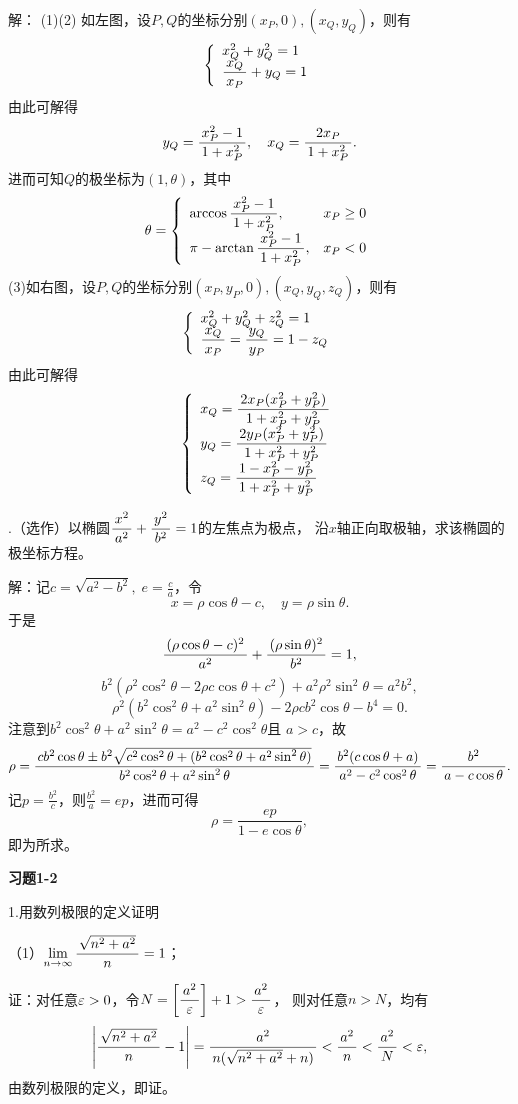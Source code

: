解：
(1)(2) 如左图，设$P,Q$的坐标分别$(x_P,0),(x_Q,y_Q)$，则有
$$
\left\{
\begin{array}{l}
	x^2_Q+y^2_Q=1\\
	\displaystyle\frac{\,{x_Q}\,}{\,{x_P}\,}+y_Q=1
\end{array}
\right.
$$
由此可解得
$$y_Q=\displaystyle\frac{\,{x^2_P-1}\,}{\,{1+x^2_P}\,},\quad x_Q=\displaystyle\frac{\,{2x_P}\,}{\,{1+x^2_P}\,}.$$
进而可知$Q$的极坐标为$(1,\theta)$，其中
$$\theta=
\left\{
\begin{array}{ll}
	\arccos\displaystyle\frac{\,{x^2_P-1}\,}{\,{1+x^2_P}\,},& x_P\geq 0\\
	\pi-\arctan\displaystyle\frac{\,{x^2_P-1}\,}{\,{1+x^2_P}\,}, & x_P<0
\end{array}
\right.
$$
(3)如右图，设$P,Q$的坐标分别$(x_P,y_P,0),(x_Q,y_Q,z_Q)$，则有
$$
\left\{
\begin{array}{l}
	x^2_Q+y^2_Q+z^2_Q=1\\
	\displaystyle\frac{\,{x_Q}\,}{\,{x_P}\,}=\displaystyle\frac{\,{y_Q}\,}{\,{y_P}\,}=1-z_Q
\end{array}
\right.
$$
由此可解得
$$
\left\{
\begin{array}{l}
	x_Q=\displaystyle\frac{\,{2x_P(x^2_P+y^2_P)}\,}{\,{1+x^2_P+y^2_P}\,}\\
	y_Q=\displaystyle\frac{\,{2y_P(x^2_P+y^2_P)}\,}{\,{1+x^2_P+y^2_P}\,}\\
	z_Q=\displaystyle\frac{\,{1-x^2_P-y^2_P}\,}{\,{1+x^2_P+y^2_P}\,}
\end{array}
\right.
$$
\fin

.（选作）以椭圆$\displaystyle\frac{\,{x^2}\,}{\,{a^2}\,}+\displaystyle\frac{\,{y^2}\,}{\,{b^2}\,}=1$的左焦点为极点，
沿$x$轴正向取极轴，求该椭圆的极坐标方程。

解：记$c=\sqrt{a^2-b^2},\;e=\frac ca$，令
$$x=\rho\cos\theta-c,\quad y=\rho\sin\theta.$$
于是
$$\displaystyle\frac{\,{(\rho\cos\theta-c)^2}\,}{\,{a^2}\,}+\displaystyle\frac{\,{(\rho\sin\theta)^2}\,}{\,{b^2}\,}=1,$$
$$b^2(\rho^2\cos^2\theta-2\rho c\cos\theta+c^2)
+a^2\rho^2\sin^2\theta=a^2b^2,$$
$$\rho^2(b^2\cos^2\theta+a^2\sin^2\theta)-2\rho cb^2\cos\theta-b^4=0.$$
注意到$b^2\cos^2\theta+a^2\sin^2\theta=a^2-c^2\cos^2\theta$且
$a>c$，故
$$\rho=\displaystyle\frac{\,{cb^2\cos\theta\pm b^2\sqrt{c^2\cos^2\theta
+(b^2\cos^2\theta+a^2\sin^2\theta)}}\,}{\,{b^2\cos^2\theta
+a^2\sin^2\theta}\,}=\displaystyle\frac{\,{b^2(c\cos\theta+a)}\,}{\,{a^2-c^2\cos^2\theta}\,}
=\displaystyle\frac{\,{b^2}\,}{\,{a-c\cos\theta}\,}.$$
记$p=\frac{b^2}{c}$，则$\frac{b^2}{a}=ep$，进而可得
$$\rho=\frac{ep}{1-e\cos\theta},$$
即为所求。\fin

\begin{center}
	\bf 习题1-2
\end{center}

1.用数列极限的定义证明

（1）$\lim\limits_{n\to\infty}\displaystyle\frac{\,{\sqrt{n^2+a^2}}\,}{\,{n}\,}=1$；

证：对任意$\varepsilon>0$，令$N=\left[\displaystyle\frac{\,{a^2}\,}{\,{\varepsilon}\,}\right]+1>\displaystyle\frac{\,{a^2}\,}{\,{\varepsilon}\,}$，
则对任意$n>N$，均有
$$\left|\displaystyle\frac{\,{\sqrt{n^2+a^2}}\,}{\,{n}\,}-1\right|
=\displaystyle\frac{\,{a^2}\,}{\,{n(\sqrt{n^2+a^2}+n)}\,}<\displaystyle\frac{\,{a^2}\,}{\,{n}\,}<\displaystyle\frac{\,{a^2}\,}{\,{N}\,}<\varepsilon,
$$
由数列极限的定义，即证。\fin


